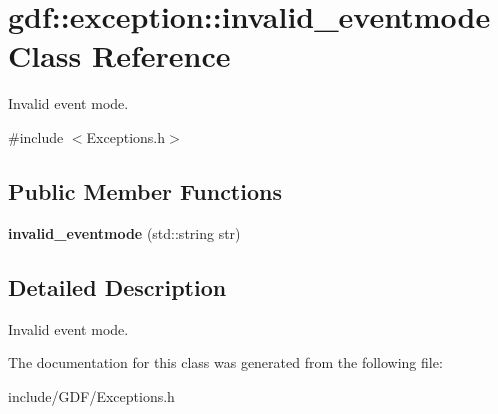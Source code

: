 \hypertarget{classgdf_1_1exception_1_1invalid__eventmode}{
\section{gdf::exception::invalid\_\-eventmode Class Reference}
\label{classgdf_1_1exception_1_1invalid__eventmode}
}


Invalid event mode.  




{\ttfamily \#include $<$Exceptions.h$>$}

\subsection*{Public Member Functions}
\begin{DoxyCompactItemize}
\item 
\hypertarget{classgdf_1_1exception_1_1invalid__eventmode_ae26137abe6427cc826f03afb261adf8f}{
{\bfseries invalid\_\-eventmode} (std::string str)}
\label{classgdf_1_1exception_1_1invalid__eventmode_ae26137abe6427cc826f03afb261adf8f}

\end{DoxyCompactItemize}


\subsection{Detailed Description}
Invalid event mode. 

The documentation for this class was generated from the following file:\begin{DoxyCompactItemize}
\item 
include/GDF/Exceptions.h\end{DoxyCompactItemize}
